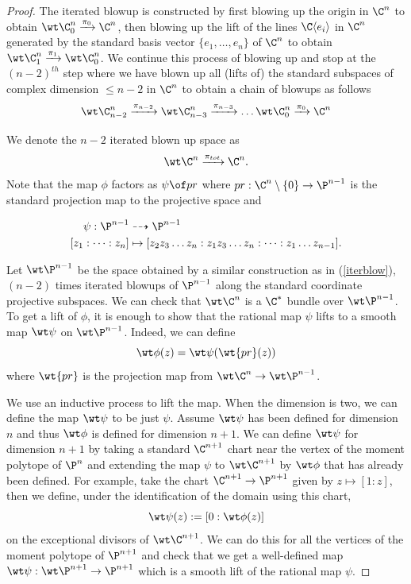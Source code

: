 \begin{proof}

The iterated blowup is constructed by first blowing up the origin in $\C^n$ to obtain $\wt \C^n_0 \xrightarrow{\pi_0} \C^n$, then blowing up the lift of the lines $\C\langle e_i \rangle$ in $\C^n$ generated  by the standard basis vector $\{e_1,\dots,e_n\}$ of $\C^n$ to obtain $\wt \C^n _1 \xrightarrow{\pi_1} \wt \C_0^n$. We continue this process of blowing up and stop at the $(n-2)^{th}$ step where we have blown up all (lifts of) the standard subspaces of complex dimension $\leq n-2$ in $\C^n$ to obtain a chain of blowups as follows 
\begin{equation}\label{iterblow}
    \wt \C^n _{n-2} \xrightarrow{\pi_{n-2}} \wt \C_{n-3}^n \xrightarrow{\pi_{n-3}} \dots  \wt \C^n_0 \xrightarrow{\pi_0} \C^n
\end{equation}

\noindent We denote the $n-2$ iterated blown up space as $$\wt \C^n \xrightarrow{\pi_{tot}} \C^n.$$ Note that the map $\phi$ factors as $\psi \of pr$ where $pr:\C^n \setminus \{0\} \to \P^{n-1}$ is the standard projection map to the projective space and 

\begin{align*}
    \psi : \P^{n-1} &\dashrightarrow \P^{n-1} \\
    [z_1 : \dots : z_n]&\mapsto [z_2z_3\dots z_n : z_1z_3\dots z_n:\dots : z_1\dots z_{n-1} ].
\end{align*}

Let $\wt \P^{n-1}$ be the space obtained by a similar construction as in (\ref{iterblow}), $(n-2)$ times iterated blowups of $\P^{n-1}$ along the standard coordinate projective subspaces. We can check that $\wt \C^n$ is a $\C^*$ bundle over $\wt \P^{n-1}$. To get a lift of $\phi$, it is enough to show that the rational map $\psi$ lifts to a smooth map $\wt \psi$ on $\wt \P^{n-1}$. Indeed, we can define $$\wt \phi (z)  = \wt \psi (\wt{pr}  (z))$$ where $\wt{pr}$ is the projection map from $\wt \C^n \to \wt \P^{n-1}$.

We use an inductive process to lift the map. When the dimension is two, we can define the map $\wt \psi$ to be just $\psi$. Assume $\wt \psi$ has been defined for dimension $n$ and thus $\wt \phi$ is defined for dimension $n+1$. We can define $\wt \psi$ for dimension $n+1$ by taking  a standard $\C^{n+1}$ chart near the vertex of the moment polytope of $\P^n$ and extending the map $\psi$ to $\wt \C^{n+1}$ by $\wt\phi$ that has already been defined. For example, take the chart $\C^{n+1} \to \P^{n+1}$ given by $z\mapsto [1:z]$, then we define, under the identification of the domain using this chart,  $$\wt\psi ( z) := [0:\wt\phi(z)]$$ on the exceptional divisors of $\wt \C^{n+1}$. We can do this for all the vertices of the moment polytope of $\P^{n+1}$ and check that we get a well-defined map $\wt \psi : \wt \P^{n+1} \to \P^{n+1} $ which is a smooth lift of the rational map $\psi$.

\end{proof}

